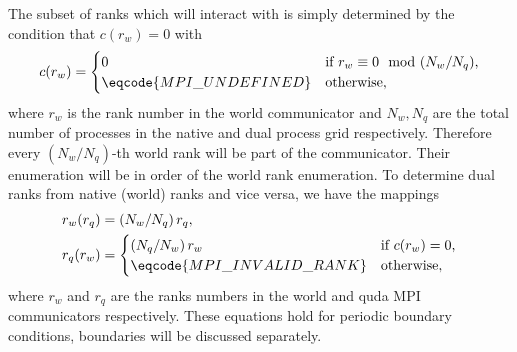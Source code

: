 The subset of ranks which will interact with \quda is simply determined by the condition that $c(r_w)=0$ with
\begin{equation} \label{eq:dual:rank:condition:periodic}
c(r_w) = \begin{cases}
  0                       & \text{if $r_w \equiv 0 \mod (N_w / N_q)$,} \\
  \eqcode{MPI\_UNDEFINED}   & \text{otherwise},
\end{cases}
\end{equation}
where $r_w$ is the rank number in the world communicator and $N_w, N_q$ are the total number of processes in the native and dual process grid respectively. Therefore every $(N_w/N_q)$-th world rank will be part of the \quda communicator. Their enumeration will be in order of the world rank enumeration. To determine dual ranks from native (world) ranks and vice versa, we have the mappings
\begin{align}
r_w(r_q) &= \left( N_w / N_q \right) r_q, \label{eq:dual:rank:d2n:mapping:periodic} \\
r_q(r_w) &= 
\begin{cases}
  \left( N_q / N_w \right) r_w    & \text{if $c(r_w)=0$,} \\
  \eqcode{MPI\_INVALID\_RANK}       & \text{otherwise},
\end{cases} \label{eq:dual:rank:n2d:mapping:periodic}
\end{align}
where $r_w$ and $r_q$ are the ranks numbers in the world and quda MPI communicators respectively.
These equations hold for periodic boundary conditions, \Cstar boundaries will be discussed separately.


